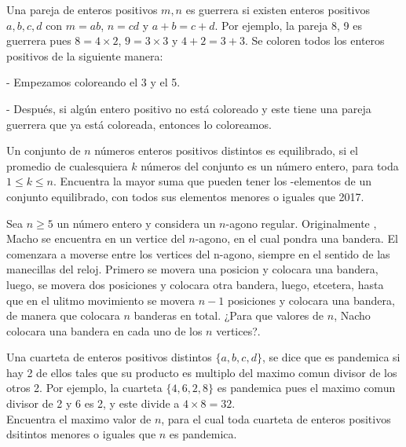 \documentclass[11pt]{scrartcl}
\begin{document}
\begin{problem}
[2016/2]Una pareja de enteros positivos $m, n$ es guerrera si existen enteros positivos $a, b, c, d$ con $m = ab$, $n = cd$ y $a + b = c + d$. Por ejemplo, la pareja 8, 9 es guerrera pues $8 = 4 \times 2$, $9 = 3 \times 3$ y $4 + 2 = 3 + 3$. Se coloren todos los enteros positivos de la siguiente manera:

- Empezamos coloreando el 3 y el 5.

- Después, si algún entero positivo no está coloreado y este tiene una pareja guerrera que ya está coloreada, entonces lo coloreamos.
\end{problem}

\begin{problem}
[2017/2]Un conjunto de $n$ números enteros positivos distintos es equilibrado, si el promedio de cualesquiera $k$ números del conjunto es un número entero, para toda $1 \leq k \leq n$. Encuentra la mayor suma que pueden tener los -elementos de un conjunto equilibrado, con todos sus elementos menores o iguales que 2017.

\end{problem}

\begin{problem}
[2018/5] Sea $n\geq 5$ un número entero y considera un $n$-agono regular. Originalmente , Macho se encuentra en un vertice del $n$-agono, en el cual pondra una bandera. El comenzara a moverse entre los vertices del n-agono, siempre en el sentido de las manecillas del reloj. Primero se movera una posicion y colocara una bandera, luego, se movera dos posiciones y colocara otra bandera, luego, etcetera, hasta que en el ulitmo movimiento se movera $n-1$ posiciones y colocara una bandera, de manera que colocara $n$ banderas en total. ¿Para que valores de $n$, Nacho colocara una bandera en cada uno de los $n$ vertices?.
\end{problem}

\begin{problem}
[2020/5] Una cuarteta de enteros positivos distintos $\{ a,b,c,d\}$, se dice que es pandemica si hay 2 de ellos tales que su producto es multiplo del maximo comun divisor de los otros 2. Por ejemplo, la cuarteta $\{ 4,6,2,8 \}$ es pandemica pues el maximo comun divisor de 2 y 6 es 2, y este divide a $4 \times 8 =32$. \\
Encuentra el maximo valor de $n$, para el cual toda cuarteta de enteros positivos dsitintos menores o iguales que $n$ es pandemica.
\end{problem}
\end{document}
